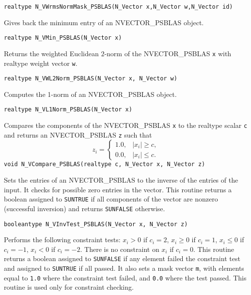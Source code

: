 \documentclass[twoside,a4paper]{refart}
\begin{document}
\begin{description}
 	 \lstinline[style=CStyle]|realtype N_VWrmsNormMask_PSBLAS(N_Vector x,N_Vector w,N_Vector id)|
 	
 	\item[\fbox{\texttt{N\_VMin\_PSBLAS}}] Gives back the minimum entry of an NVECTOR\_PSBLAS object.
 	
 	 \lstinline[style=CStyle]|realtype N_VMin_PSBLAS(N_Vector x)|
 	
 	\item[\fbox{\texttt{N\_VWL2Norm\_PSBLAS}}] Returns the weighted Euclidean $2$-norm of the NVECTOR\_PSBLAS \lstinline[style=CStyle]|x| with realtype weight vector \lstinline[style=CStyle]|w|.
 	
 	 \lstinline[style=CStyle]|realtype N_VWL2Norm_PSBLAS(N_Vector x, N_Vector w)|
 	
 	\item[\fbox{\texttt{N\_VL1Norm\_PSBLAS}}] Computes the 1-norm of an NVECTOR\_PSBLAS object.
 	
 	 \lstinline[style=CStyle]|realtype N_VL1Norm_PSBLAS(N_Vector x)|
 	
 	\item[\fbox{\texttt{N\_VCompare\_PSBLAS}}] Compares the components of the NVECTOR\_PSBLAS \lstinline[style=CStyle]|x| to the realtype scalar \lstinline[style=CStyle]|c|
 	and returns an NVECTOR\_PSBLAS \lstinline[style=CStyle]|z| such that 
 	\begin{equation*}
 	z_i = \begin{cases}
 	1.0, & |x_i| \geq c,\\
 	0.0, & |x_i| \le c.
 	\end{cases}
 	\end{equation*}
 	 \lstinline[style=CStyle]|void N_VCompare_PSBLAS(realtype c, N_Vector x, N_Vector z)|
 	
 	\item[\fbox{\texttt{N\_VInvTest\_PSBLAS}}] Sets the entries of an NVECTOR\_PSBLAS to the inverse of the entries of the input. It checks for possible zero entries in the vector. This routine returns a boolean assigned to \lstinline[style=CStyle]|SUNTRUE| if all
 	components of the vector are nonzero (successful inversion) and returns \lstinline[style=CStyle]|SUNFALSE| otherwise.
 	
 	 \lstinline[style=CStyle]|booleantype N_VInvTest_PSBLAS(N_Vector x, N_Vector z)|
 	
 	\item[\fbox{\texttt{N\_VConstrMask\_PSBLAS}}] Performs the following constraint tests: $x_i > 0$ if $c_i = 2$, $x_i \geq 0$ if $c_i = 1$,
 	$x_i \leq 0$ if $c_i = -1$, $x_i < 0$ if $c_i = -2$. There is no constraint on $x_i$ if $c_i = 0$.
 	This routine returns a boolean assigned to \lstinline[style=CStyle]|SUNFALSE| if any element failed
 	the constraint test and assigned to \lstinline[style=CStyle]|SUNTRUE| if all passed. It also sets a
 	mask vector \lstinline[style=CStyle]|m|, with elements equal to \lstinline[style=CStyle]|1.0| where the constraint test failed,
 	and \lstinline[style=CStyle]|0.0| where the test passed. This routine is used only for constraint
 	checking.
 	

\end{description}
\end{document}
